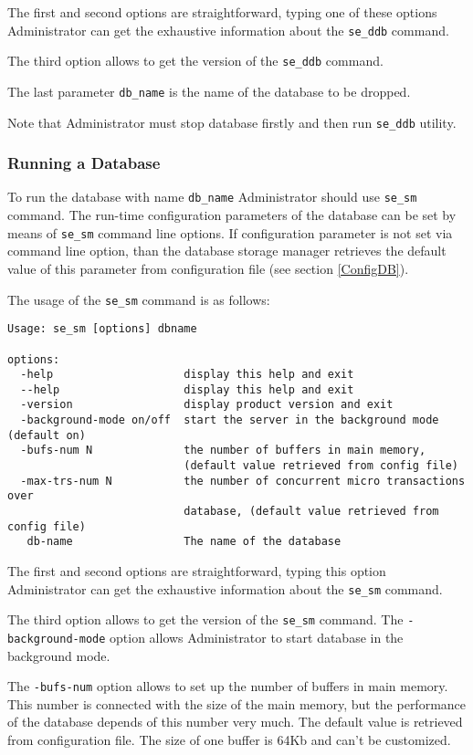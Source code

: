 \documentclass[a4paper,12pt]{article}
\begin{document}
The first and second options are straightforward, typing one of these options Administrator can get the exhaustive information about the \verb!se_ddb! command.

The third option allows to get the version of the \verb!se_ddb! command.

The last parameter \verb!db_name! is the name of the database to be dropped.

Note that Administrator must stop database firstly and then run \verb!se_ddb! utility. 

\subsubsection{Running a Database}
\label{RunDB}

To run the database with name \verb!db_name! Administrator should use \verb!se_sm! command. The run-time configuration parameters of the database can be set by means of \verb!se_sm! command line options. If configuration parameter is not set via command line option, than the database storage manager retrieves the default value of this parameter from configuration file (see section \ref{ConfigDB}).

The usage of the \verb!se_sm! command is as follows:

\begin{verbatim}
Usage: se_sm [options] dbname

options:
  -help                    display this help and exit
  --help                   display this help and exit
  -version                 display product version and exit
  -background-mode on/off  start the server in the background mode (default on)
  -bufs-num N              the number of buffers in main memory,
                           (default value retrieved from config file)
  -max-trs-num N           the number of concurrent micro transactions over
                           database, (default value retrieved from config file)
   db-name                 The name of the database
\end{verbatim}


The first and second options are straightforward, typing this option Administrator can get the exhaustive information about the \verb!se_sm! command.

The third option allows to get the version of the \verb!se_sm! command.
The \verb!-background-mode! option allows Administrator to start database in the background mode.

The \verb!-bufs-num! option allows to set up the number of buffers in main memory. This number is connected with the size of the main memory, but the performance of the database depends of this number very much. The default value is retrieved from configuration file. The size of one buffer is 64Kb and can't be customized.
\end{document}
